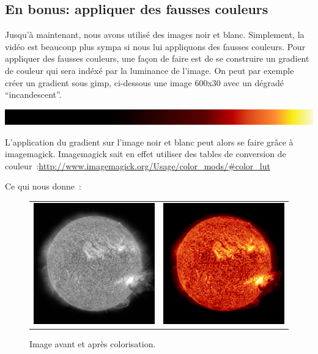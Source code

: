 \subsection{En bonus: appliquer des fausses couleurs}

Jusqu'à maintenant, nous avons utilisé des images noir et blanc. Simplement, la vidéo est beaucoup plus sympa si nous lui appliquons des fausses couleurs. Pour appliquer des fausses couleurs, une façon de faire est de se construire un gradient de couleur qui sera indéxé par la luminance de l'image. On peut par exemple créer un gradient sous gimp, ci-dessous une image 600x30 avec un dégradé ``incandescent''.
\begin{center}
\includegraphics[width=0.7\linewidth]{Figs/soleil_gradient.jpg}
\end{center}

L'application du gradient sur l'image noir et blanc peut alors se faire grâce à imagemagick. Imagemagick sait en effet utiliser des tables de conversion de couleur~:\url{http://www.imagemagick.org/Usage/color_mods/#color_lut}
\begin{center}
\end{center}
Ce qui nous donne~:
\begin{figure}[htbp]
\begin{tabular}{cc}
\includegraphics[width=0.3\columnwidth]{Figs/soleil_greyscale.jpg}&
\includegraphics[width=0.3\columnwidth]{Figs/soleil_false_color.jpg}
\end{tabular}
\caption{\label{fig:soleil_false_color} Image avant et après colorisation.}
\end{figure}


